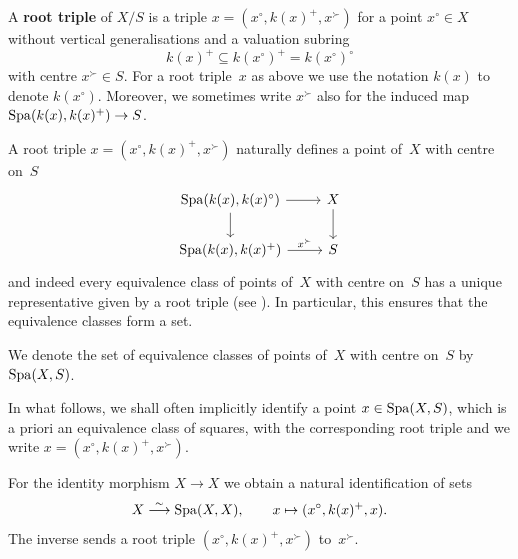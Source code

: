 \begin{defi} \label{defi:root-triple}
    A {\bf root triple} of $X/S$ is a triple $x = (x^\circ,k(x)^+,x^\succ)$ for a point $x^\circ \in X$ without vertical generalisations and a valuation subring 
    \[
        k(x)^+ \subseteq k(x^\circ)^+ = k(x^\circ)^\circ
    \]
    with centre $x^\succ \in S$. For a root triple~$x$ as above we use the notation $k(x)$ to denote $k(x^\circ)$.
    Moreover, we sometimes write $x^\succ$ also for the induced map $\operatorname{Spa}(k(x),k(x)^+) \to S$.
\end{defi}

A root triple $x = (x^\circ,k(x)^+,x^\succ)$ naturally defines a point of~$X$ with centre on~$S$
    \[  
        \begin{tikzcd}
            \Spa(k(x), k(x)^\circ) \ar[r] \ar[d] & X \ar[d] \\
            \Spa(k(x), k(x)^+) \ar[r,"x^\succ"] & S
        \end{tikzcd}
    \]
and indeed every equivalence class of points of~$X$ with centre on~$S$ has a unique representative given by a root triple (see \cite[Lemma~4.2]{Solodov-vertical-compactification}).
In particular, this ensures that the equivalence classes form a set.

\begin{defi}
    We denote the set of equivalence classes of points of~$X$ with centre on~$S$ by $\operatorname{Spa}(X,S)$.
\end{defi}

In what follows, we shall often implicitly identify a point $x \in \operatorname{Spa}(X,S)$, which is a priori an equivalence class of squares, with the corresponding root triple and we write $x = (x^\circ,k(x)^+,x^\succ)$.

\begin{ex} \label{ex:comp-affinoid}
    For the identity morphism $X \to X$ we obtain a natural identification of sets
    \[
     X \overset{\sim}{\longrightarrow} \operatorname{Spa}(X,X), \qquad x \mapsto (x^\circ,k(x)^+,x).
    \]
    The inverse sends a root triple $(x^\circ,k(x)^+,x^\succ)$ to~$x^\succ$.
\end{ex}

